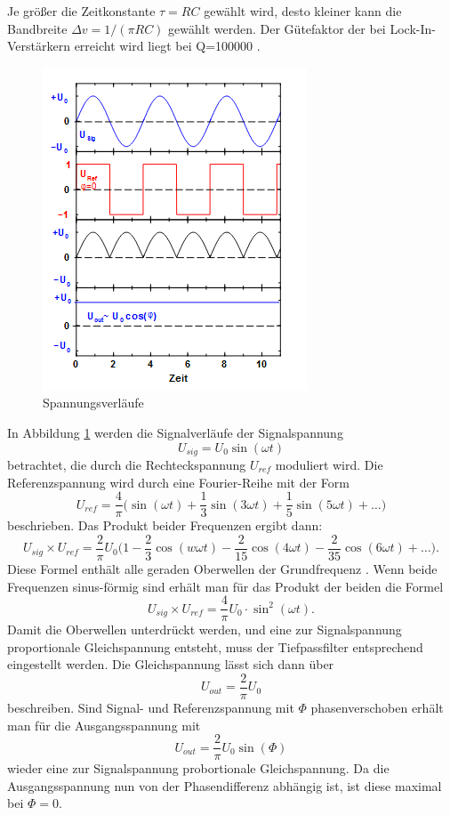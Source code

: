 Je größer die Zeitkonstante $\tau =RC$ gewählt wird, desto kleiner kann die
Bandbreite $\Delta v=1/(\pi RC)$ gewählt werden.
Der Gütefaktor der bei Lock-In-Verstärkern erreicht wird liegt bei Q=100000
\cite{303}.
\newpage
\begin{figure}[h]
  \centering
  \includegraphics{Bilder/Spannung.jpeg}
  \caption{Spannungsverläufe}
  \label{fig:spannung}
\end{figure}
In Abbildung \ref{fig:spannung} werden die Signalverläufe der Signalspannung
\begin{equation}
  U_{sig}=U_0\sin(\omega t)
\end{equation}
betrachtet, die durch die Rechteckspannung $U_{ref}$ moduliert wird.
Die Referenzspannung wird durch eine Fourier-Reihe mit der Form
\begin{equation}
  U_{ref}=\frac{4}{\pi}\biggl(\sin(\omega t)+\frac{1}{3}\sin(3\omega t)
  +\frac{1}{5}\sin(5\omega t)+\dots\biggr)
\end{equation}
beschrieben. Das Produkt beider Frequenzen ergibt dann:
\begin{equation}
  U_{sig}\times U_{ref} =\frac{2}{\pi}U_0\biggl(1-\frac{2}{3}\cos(w\omega t)
  -\frac{2}{15}\cos(4\omega t)-\frac{2}{35}\cos(6\omega t)+\dots\biggr).
\end{equation}
Diese Formel enthält alle geraden Oberwellen der Grundfrequenz \omega.
Wenn beide Frequenzen sinus-förmig sind erhält man für das Produkt der beiden
die Formel
\begin{equation}
  U_{sig}\times U_{ref}=\frac{4}{\pi}U_0 \cdot \sin^2(\omega t).
\end{equation}
Damit die Oberwellen unterdrückt werden, und eine zur Signalspannung proportionale
Gleichspannung entsteht, muss der Tiefpassfilter entsprechend eingestellt werden.
Die Gleichspannung lässt sich dann über
\begin{equation}
  U_{out}=\frac{2}{\pi}U_0
\end{equation}
beschreiben.
Sind Signal- und Referenzspannung mit $\Phi$ phasenverschoben erhält man für
die Ausgangsspannung mit
\begin{equation}
  U_{out}=\frac{2}{\pi}U_0\sin(\Phi)
\end{equation}
wieder eine zur Signalspannung probortionale Gleichspannung. Da die Ausgangsspannung
nun von der Phasendifferenz abhängig ist, ist diese maximal bei $\Phi=0$.
